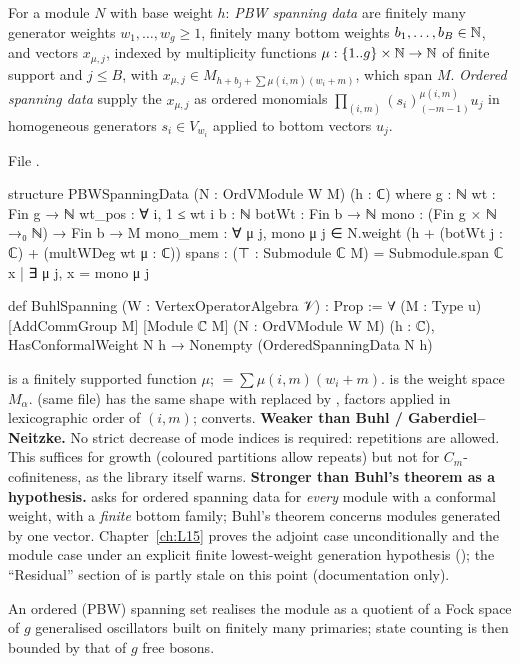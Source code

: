 \begin{definition}\label{l14:def:pbw}
For a module $N$ with base weight $h$: \emph{PBW spanning data} are finitely many generator weights $w_1,\dots,w_g\ge1$,
finitely many bottom weights $b_1,\dots,b_B\in{\mathbb{N}}$, and vectors $x_{\mu,j}$, indexed by multiplicity functions
$\mu:\{1..g\}\times{\mathbb{N}}\to{\mathbb{N}}$ of finite support and $j\le B$, with $x_{\mu,j}\in M_{h + b_j + \sum\mu(i,m)(w_i+m)}$, which span
$M$. \emph{Ordered spanning data} supply the $x_{\mu,j}$ as ordered monomials
$\prod_{(i,m)}(s_i)_{(-m-1)}^{\mu(i,m)}u_j$ in homogeneous generators $s_i\in V_{w_i}$ applied to bottom vectors $u_j$.
\end{definition}
\noindent File .
\begin{leancode}
structure PBWSpanningData (N : OrdVModule W M) (h : ℂ) where
  g : ℕ
  wt : Fin g → ℕ
  wt_pos : ∀ i, 1 ≤ wt i
  b : ℕ
  botWt : Fin b → ℕ
  mono : (Fin g × ℕ →₀ ℕ) → Fin b → M
  mono_mem : ∀ μ j, mono μ j ∈ N.weight (h + (botWt j : ℂ) + (multWDeg wt μ : ℂ))
  spans : (⊤ : Submodule ℂ M) = Submodule.span ℂ {x | ∃ μ j, x = mono μ j}

def BuhlSpanning (W : VertexOperatorAlgebra 𝒱) : Prop :=
  ∀ (M : Type u) [AddCommGroup M] [Module ℂ M] (N : OrdVModule W M) (h : ℂ),
    HasConformalWeight N h → Nonempty (OrderedSpanningData N h)
\end{leancode}
\begin{dictionary}
 is a finitely supported function $\mu$;  $=\sum\mu(i,m)(w_i+m)$. 
is the weight space $M_\alpha$.  (same file) has the same shape with  replaced by
, factors applied in lexicographic order of $(i,m)$; 
converts. \textbf{Weaker than Buhl / Gaberdiel--Neitzke.} No strict decrease of mode indices is required: repetitions are
allowed. This suffices for growth (coloured partitions allow repeats) but not for $C_m$-cofiniteness, as the library itself
warns. \textbf{Stronger than Buhl's theorem as a hypothesis.}  asks for ordered spanning data for
\emph{every} module with a conformal weight, with a \emph{finite} bottom family; Buhl's theorem concerns modules generated by
one vector. Chapter~\ref{ch:L15} proves the adjoint case unconditionally and the module case under an explicit finite
lowest-weight generation hypothesis (); the ``Residual'' section of
 is partly stale on this point (documentation only).
\end{dictionary}
\begin{physics}
An ordered (PBW) spanning set realises the module as a quotient of a Fock space of $g$ generalised oscillators built on finitely
many primaries; state counting is then bounded by that of $g$ free bosons.
\end{physics}

